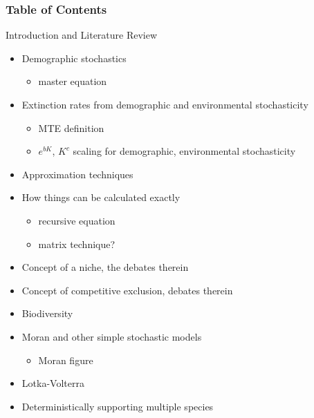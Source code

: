 \documentclass[8pt]{beamer}
\begin{document}
\begin{frame}
\frametitle{Table of Contents}
Introduction and Literature Review
	\begin{itemize}
		\item Demographic stochastics
		\begin{itemize}
			\item master equation
		\end{itemize}
		\item Extinction rates from demographic and environmental stochasticity
		\begin{itemize}
			\item MTE definition
			\item $e^{bK}$, $K^{c}$ scaling for demographic, environmental stochasticity
		\end{itemize}
		\item Approximation techniques
		\item How things can be calculated exactly
		\begin{itemize}
			\item recursive equation
			\item matrix technique?
		\end{itemize}
		\item Concept of a niche, the debates therein
		\item Concept of competitive exclusion, debates therein
		\item Biodiversity
		\item Moran and other simple stochastic models
		\begin{itemize}
			\item Moran figure
		\end{itemize}
		\item Lotka-Volterra
		\item Deterministically supporting multiple species
	\end{itemize}
\end{frame}
\end{document}
